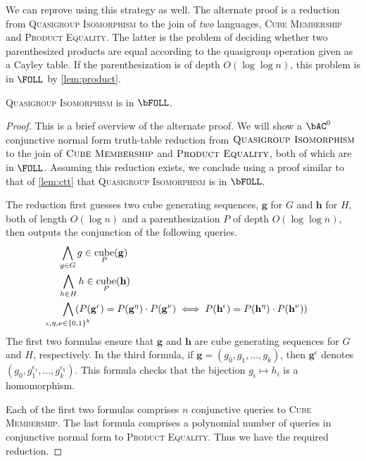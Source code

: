 \documentclass{article}
\DeclareMathOperator{\cube}{cube}
\begin{document}
We can reprove \autocite[Theorem~3.4]{ctw13} using this strategy as well.
The alternate proof is a reduction from \textsc{Quasigroup Isomorphism} to the join of \emph{two} languages, \textsc{Cube Membership} and \textsc{Product Equality}.
The latter is the problem of deciding whether two parenthesized products are equal according to the quasigroup operation given as a Cayley table.
If the parenthesization is of depth $O(\log \log n)$, this problem is in $\FOLL$ by \autoref{lem:product}.

\begin{theorem}
  \textsc{Quasigroup Isomorphism} is in $\bFOLL$.
\end{theorem}
\begin{proof}
  This is a brief overview of the alternate proof.
  We will show a $\bAC^0$ conjunctive normal form truth-table reduction from $\textsc{Quasigroup Isomorphism}$ to the join of $\textsc{Cube Membership}$ and $\textsc{Product Equality}$, both of which are in $\FOLL$.
  Assuming this reduction exists, we conclude using a proof similar to that of \autoref{lem:ctt} that \textsc{Quasigroup Isomorphism} is in $\bFOLL$.

  The reduction first guesses two cube generating sequences, $\mathbf{g}$ for $G$ and $\mathbf{h}$ for $H$, both of length $O(\log n)$ and a parenthesization $P$ of depth $O(\log \log n)$, then outputs the conjunction of the following queries.
  \begin{align}
    & \bigwedge_{g \in G} g \in \cube_P(\mathbf{g}) \\
    & \bigwedge_{h \in H} h \in \cube_P(\mathbf{h}) \\
    & \; \bigwedge_{\mathclap{\epsilon, \eta, \nu \in \{0, 1\}^k}} \left(P(\mathbf{g}^\epsilon) = P(\mathbf{g}^\eta) \cdot P(\mathbf{g}^\nu) \iff P(\mathbf{h}^\epsilon) = P(\mathbf{h}^\eta) \cdot P(\mathbf{h}^\nu)\right)
  \end{align}
  The first two formulas ensure that $\mathbf{g}$ and $\mathbf{h}$ are cube generating sequences for $G$ and $H$, respectively.
  In the third formula, if $\mathbf{g} = (g_0, g_1, \dotsc, g_k)$, then $\mathbf{g}^\epsilon$ denotes $(g_0, g_1^{\epsilon_1}, \dotsc, g_k^{\epsilon_k})$.
  This formula checks that the bijection $g_i \mapsto h_i$ is a homomorphism.

  Each of the first two formulas comprises $n$ conjunctive queries to \textsc{Cube Membership}.
  The last formula comprises a polynomial number of queries in conjunctive normal form to \textsc{Product Equality}.
  Thus we have the required reduction.
\end{proof}
\end{document}
